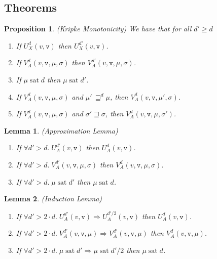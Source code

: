 \documentclass[preprint]{sigplanconf}
\newcommand{\betterstate}[3]{{#2}\, {\sqsupseteq}^{#1} {#3}}
\renewcommand{\implies}{\Rightarrow}
\newcommand{\term}[1]{\ensuremath{\mathtt{{#1}}}}
\newcommand{\satisfy}[2]{{#1}\;\mathrm{sat}\;{#2}}
\newtheorem{prop}{Proposition}
\newtheorem{lemma}{Lemma}
\begin{document}
\subsection{Theorems}

\begin{prop}{(Kripke Monotonicity)}
We have that for all $d' \geq d$
\begin{enumerate}
\item If $U^d_X(v, \term{v})$ then $U^{d'}_X(v, \term{v})$. 
\item If $V^d_A(v, \term{v}, \mu, \sigma)$ then $V^{d'}_A(v, \term{v}, \mu, \sigma)$. 
\item If $\satisfy{\mu}{d}$ then $\satisfy{\mu}{d'}$. 
\item If $V^d_A(v, \term{v}, \mu, \sigma)$ and $\betterstate{d}{\mu'}{\mu}$, then $V^d_A(v, \term{v}, \mu',\sigma)$.
\item If $V^d_A(v, \term{v}, \mu, \sigma)$ and $\sigma' \sqsupseteq \sigma$, then $V^d_A(v, \term{v}, \mu,\sigma')$.
\end{enumerate}
\end{prop}

\begin{lemma}{(Approximation Lemma)}
\begin{enumerate}
  \item If $\forall d' > d.\; U^{d'}_A(v, \term{v})$ then $U^d_A(v, \term{v})$. 
  \item If $\forall d' > d.\; V^{d'}_A(v, \term{v}, \mu, \sigma)$ then $V^d_A(v, \term{v}, \mu, \sigma)$. 
  \item If $\forall d' > d.\; \satisfy{\mu}{d'}$ then $\satisfy{\mu}{d}$. 
\end{enumerate}
\end{lemma}

\begin{lemma}{(Induction Lemma)}
\begin{enumerate}
  \item If $\forall d' > 2\cdot d.\; U^{d'}_A(v, \term{v}) \implies U^{d'/2}_A(v, \term{v})$ then $U^d_A(v, \term{v})$. 
  \item If $\forall d' > 2\cdot d.\; V^{d'}_A(v, \term{v}, \mu) \implies V^{d'}_A(v, \term{v}, \mu)$ then $V^d_A(v, \term{v}, \mu)$. 
  \item If $\forall d' > 2\cdot d.\; \satisfy{\mu}{d'} \implies \satisfy{\mu}{d'/2}$ then $\satisfy{\mu}{d}$. 
\end{enumerate}
\end{lemma}
\end{document}
